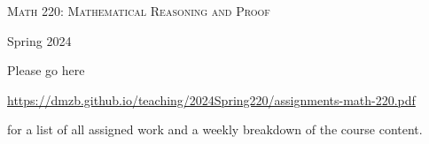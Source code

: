\documentclass[12pt]{article}
\begin{document}
\begin{center}
{\Large \textsc{Math 220: Mathematical Reasoning and Proof}}
\end{center}
\begin{center}
Spring 2024
\end{center}



\noindent Please go here 
\begin{center}
 \url{https://dmzb.github.io/teaching/2024Spring220/assignments-math-220.pdf}
\end{center}
for a list of all assigned work and a weekly breakdown of the course content.
\end{document}
